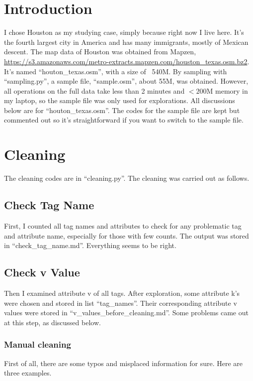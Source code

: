 \documentclass[12pt]{article}
\begin{document}
\maketitle

\section{Introduction}
I chose Houston as my studying case, simply because right now I live here. It's the fourth largest city in America and has many immigrants, mostly of Mexican descent. The map data of Houston was obtained from Mapzen, \url{https://s3.amazonaws.com/metro-extracts.mapzen.com/houston_texas.osm.bz2}. It's named ``houton\_texas.osm'', with a size of ~540M. By sampling with ``sampling.py'', a sample file, ``sample.osm'', about 55M, was obtained. However, all operations on the full data take less than 2 minutes and $<200$M memory in my laptop, so the sample file was only used for explorations. All discussions below are for ``houton\_texas.osm''. The codes for the sample file are kept but commented out so it's straightforward if you want to switch to the sample file.

\section{Cleaning}
The cleaning codes are in ``cleaning.py''. The cleaning was carried out as follows.
\subsection{Check Tag Name}
First, I counted all tag names and attributes to check for any problematic tag and attribute name, especially for those with few counts. The output was stored in ``check\_tag\_name.md''. Everything seems to be right.

\subsection{Check v Value}
Then I examined attribute v of all tags. After exploration, some attribute k's were chosen and stored in list ``tag\_names''. Their corresponding attribute v values were stored in ``v\_values\_before\_cleaning.md''. Some problems came out at this step, as discussed below.

\subsubsection{Manual cleaning}
First of all, there are some typos and misplaced information for sure. Here are three examples.
\end{document}
